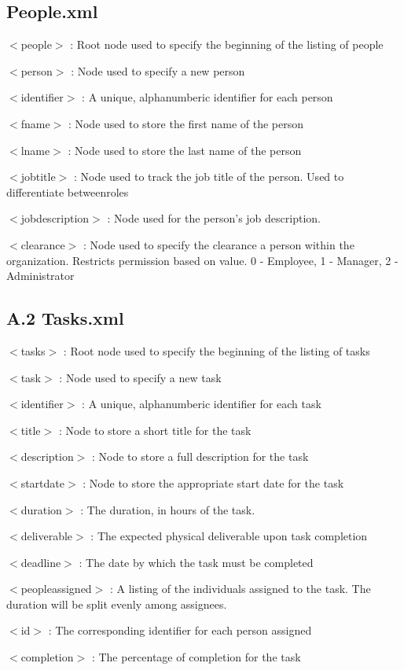 \documentclass[12pt]{article}
\begin{document}
\subsection{People.xml}
{
$<$people$>$ : Root node used to specify the beginning of the listing of people

$<$person$>$ : Node used to specify a new person

$<$identifier$>$ : A unique, alphanumberic identifier for each person

$<$fname$>$ : Node used to store the first name of the person

$<$lname$>$ : Node used to store the last name of the person

$<$jobtitle$>$ : Node used to track the job title of the person. Used to differentiate betweenroles

$<$jobdescription$>$ : Node used for the person's job description.

$<$clearance$>$ : Node used to specify the clearance a person within the organization. Restricts permission based on value. 0 - Employee, 1 - Manager, 2 - Administrator
}
\subsection{A.2 Tasks.xml}
{
$<$tasks$>$ : Root node used to specify the beginning of the listing of tasks

$<$task$>$ : Node used to specify a new task

$<$identifier$>$ : A unique, alphanumberic identifier for each task

$<$title$>$ : Node to store a short title for the task

$<$description$>$ : Node to store a full description for the task

$<$startdate$>$ : Node to store the appropriate start date for the task

$<$duration$>$ : The duration, in hours of the task.

$<$deliverable$>$ : The expected physical deliverable upon task completion

$<$deadline$>$ : The date by which the task must be completed

$<$peopleassigned$>$ : A listing of the individuals assigned to the task. The duration will be split evenly among assignees.

$<$id$>$ : The corresponding identifier for each person assigned

$<$completion$>$ : The percentage of completion for the task
}
\end{document}
